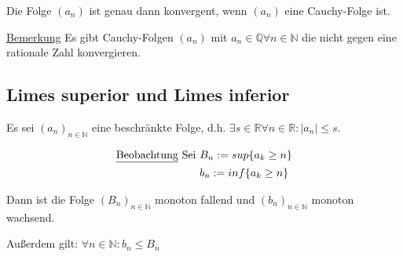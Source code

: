 \documentclass[12pt,a4paper]{article} %
\begin{document}
Die Folge $(a_n)$ ist genau dann konvergent, wenn $(a_n)$ eine Cauchy-Folge ist.

\underline{Bemerkung} Es gibt Cauchy-Folgen $(a_n)$ mit $a_n \in \mathbb{Q} \forall n \in \mathbb{N}$ die nicht gegen eine rationale Zahl konvergieren.

\subsection{Limes superior und Limes inferior}

Es sei $(a_n)_{n \in \mathbb{N}}$ eine beschränkte Folge, d.h. $\exists s \in \mathbb{R} \forall n \in \mathbb{R}: |a_n| \le s$.

\begin{align*}
	\text{\underline{Beobachtung} Sei } & B_n := sup\{a_k  \ge n\} \\
	& b_n := inf\{a_k  \ge n\}
\end{align*}

Dann ist die Folge $(B_n)_{n \in \mathbb{N}}$ monoton fallend und $(b_n)_{n \in \mathbb{N}}$ monoton wachsend.

Außerdem gilt: $\forall n \in \mathbb{N}: b_n \le B_n$
\end{document}
